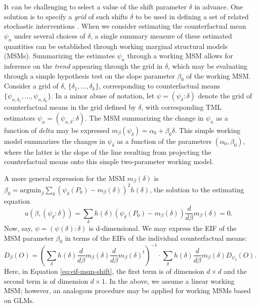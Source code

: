 \documentclass[
  12pt, krantz2,
]{krantz}
\theoremstyle{definition}
\theoremstyle{definition}
\theoremstyle{definition}
\newcommand{\1}{\mathbbm{1}}
\begin{document}
It can be challenging to select a value of the shift parameter \(\delta\) in
advance. One solution is to specify a \emph{grid} of such shifts \(\delta\) to be used
in defining a set of related stochastic interventions \citep{hejazi2020efficient}.
When we consider estimating the counterfactual mean \(\psi_n\) under several
choices of \(\delta\), a single summary measure of these estimated quantities can
be established through working marginal structural models (MSMs). Summarizing
the estimates \(\psi_n\) through a working MSM allows for inference on the \emph{trend}
appearing through the grid in \(\delta\), which may be evaluating through a simple
hypothesis test on the slope parameter \(\beta_0\) of the working MSM. Consider a
grid of \(\delta\), \(\{\delta_1, \ldots, \delta_k\}\), corresponding to
counterfactual means \(\{\psi_{n,\delta_1}, \ldots, \psi_{n, \delta_k}\}\). In a
minor abuse of notation, let \(\psi = (\psi_{\delta}: \delta)\) denote the grid of
counterfactual means in the grid defined by \(\delta\), with corresponding TML
estimators \(\psi_n = (\psi_{n,\delta}: \delta)\). The MSM summarizing the change
in \(\psi_n\) as a function of \(delta\) may be expressed \(m_{\beta}(\psi_{\delta}) = \alpha_0 + \beta_0 \delta\). This simple working model summarizes the changes
in \(\psi_{\delta}\) as a function of the parameters \((\alpha_0, \beta_0)\), where
the latter is the slope of the line resulting from projecting the counterfactual
means onto this simple two-parameter working model.

A more general expression for the MSM \(m_{\beta}(\delta)\) is \(\beta_0 = \text{argmin}_{\beta} \sum_{\delta}(\psi_{\delta}(P_0) - m_{\beta}(\delta))^2 h(\delta)\), the solution to the estimating equation
\[u(\beta, (\psi_{\delta}: \delta)) = \sum_{\delta}h(\delta)
\left(\psi_{\delta}(P_0) - m_{\beta}(\delta) \right) \frac{d}{d\beta}
m_{\beta}(\delta) = 0.\]
Now, say, \(\psi = (\psi(\delta): \delta)\) is d-dimensional. We may express the
EIF of the MSM parameter \(\beta_0\) in terms of the EIFs of the individual
counterfactual means:
\begin{equation}
   D_{\beta}(O) = \left(\sum_{\delta} h(\delta) \frac{d}{d\beta}
   m_{\beta}(\delta) \frac{d}{d\beta} m_{\beta}(\delta)^t \right)^{-1} \cdot
   \sum_{\delta} h(\delta) \frac{d}{d\beta} m_{\beta}(\delta)
   D_{\psi_{\delta}}(O).
   \label{eq:eif-msm-shift}
\end{equation}
Here, in Equation \eqref{eq:eif-msm-shift}, the first term is of dimension \(d \times d\) and the second term is of dimension \(d \times 1\). In the above, we
assume a linear working MSM; however, an analogous procedure may be applied for
working MSMs based on GLMs.
\end{document}
